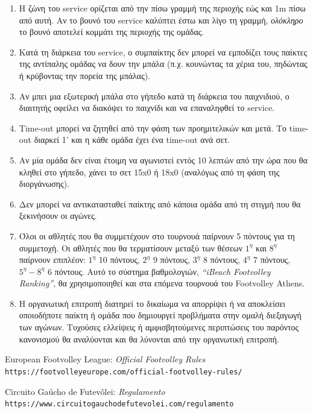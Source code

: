 \documentclass[a4paper,11pt]{article}
\begin{document}
\begin{enumerate}
\item Η ζώνη του service ορίζεται από την πίσω γραμμή της περιοχής εώς και 1m
  πίσω από αυτή. Αν το βουνό του service καλύπτει έστω και λίγο τη γραμμή,
  \textit{ολόκληρο} το βουνό αποτελεί κομμάτι της περιοχής της ομάδας.

\item Κατά τη διάρκεια του service, ο συμπαίκτης δεν μπορεί να εμποδίζει τους
  παίκτες της αντίπαλης ομάδας να δουν την μπάλα (π.χ. κουνώντας τα χέρια του,
  πηδώντας ή κρύβοντας την πορεία της μπάλας).

\item Αν μπει μια εξωτερική μπάλα στο γήπεδο κατά τη διάρκεια του παιχνιδιού, ο
  διαιτητής οφείλει να διακόψει το παιχνίδι και να επαναληφθεί το service.

\item Time-out μπορεί να ζητηθεί από την φάση των προημιτελικών και μετά. Το
  time-out διαρκεί 1' και η κάθε ομάδα έχει ένα time-out ανά σετ.

\item Αν μία ομάδα δεν είναι έτοιμη να αγωνιστεί εντός 10 λεπτών από την ώρα που
  θα κληθεί στο γήπεδο, χάνει το σετ 15x0 ή 18x0 (αναλόγως από τη φάση της
  διοργάνωσης).

\item Δεν μπορεί να αντικατασταθεί παίκτης από κάποια ομάδα από τη στιγμή που θα
  ξεκινήσουν οι αγώνες.

\item Όλοι οι αθλητές που θα συμμετέχουν στο τουρνουά παίρνουν 5 πόντους για τη
  συμμετοχή. Οι αθλητές που θα τερματίσουν μεταξύ των θέσεων $1^{\eta}$ και
  $8^{\eta}$ παίρνουν επιπλέον: $1^{\eta}$ 10 πόντους, $2^{\eta}$ 9 πόντους,
  $3^{\eta}$ 8 πόντους, $4^{\eta}$ 7 πόντους, $5^{\eta}-8^{\eta}$ 6 πόντους.
  Αυτό το σύστημα βαθμολογιών, \textit{``iBeach Footvolley Ranking''}, θα
  χρησιμοποιηθεί και στα επόμενα τουρνουά του Footvolley Athens.

\item Η οργανωτική επιτροπή διατηρεί το δικαίωμα να απορρίψει ή να αποκλείσει
  οποιοδήποτε παίκτη ή ομάδα που δημιουργεί προβλήματα στην ομαλή διεξαγωγή των
  αγώνων. Τυχούσες ελλείψεις ή αμφισβητούμενες περιπτώσεις του παρόντος
  κανονισμού θα αναλύονται και θα λύνονται από την οργανωτική επιτροπή.

\end{enumerate}

\renewcommand{\refname}{}

\begin{thebibliography}{1}

  European Footvolley League:
  \textit{Official Footvolley Rules}
  \\\texttt{https://footvolleyeurope.com/official-footvolley-rules/}

  Circuito Gaúcho de Futevôlei:
  \textit{Regulamento}
  \\\texttt{https://www.circuitogauchodefutevolei.com/regulamento}
\end{thebibliography}
\end{document}
